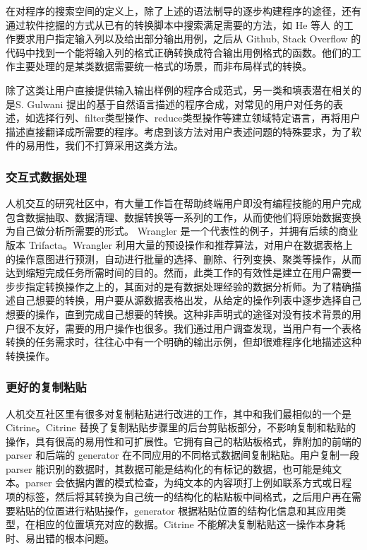 \documentclass[design, pageheader]{njubachelor}
\begin{document}
在对程序的搜索空间的定义上，除了上述的语法制导的逐步构建程序的途径，还有通过软件挖掘的方式从已有的转换脚本中搜索满足需要的方法，如 He 等人\cite{he18} 的工作要求用户指定输入列以及给出部分输出用例，之后从 Github, Stack Overflow 的代码中找到一个能将输入列的格式正确转换成符合输出用例格式的函数。他们的工作主要处理的是某类数据需要统一格式的场景，而非布局样式的转换。

除了这类让用户直接提供输入输出样例的程序合成范式，另一类和填表潜在相关的是S. Gulwani 提出的基于自然语言描述的程序合成\cite{gulwani14}，对常见的用户对任务的表述，如选择行列、filter类型操作、reduce类型操作等建立领域特定语言，再将用户描述直接翻译成所需要的程序。考虑到该方法对用户表述问题的特殊要求，为了软件的易用性，我们不打算采用这类方法。

\subsubsection{交互式数据处理}
人机交互的研究社区中，有大量工作旨在帮助终端用户即没有编程技能的用户完成包含数据抽取、数据清理、数据转换等一系列的工作，从而使他们将原始数据变换为自己做分析所需要的形式。 Wrangler\cite{kandel11} 是一个代表性的例子，并拥有后续的商业版本 Trifacta。Wrangler 利用大量的预设操作和推荐算法，对用户在数据表格上的操作意图进行预测，自动进行批量的选择、删除、行列变换、聚类等操作，从而达到缩短完成任务所需时间的目的。然而，此类工作的有效性是建立在用户需要一步步指定转换操作之上的，其面对的是有数据处理经验的数据分析师。为了精确描述自己想要的转换，用户要从源数据表格出发，从给定的操作列表中逐步选择自己想要的操作，直到完成自己想要的转换。这种非声明式的途径对没有技术背景的用户很不友好，需要的用户操作也很多。我们通过用户调查发现，当用户有一个表格转换的任务需求时，往往心中有一个明确的输出示例，但却很难程序化地描述这种转换操作。

\subsubsection{更好的复制粘贴}
人机交互社区里有很多对复制粘贴进行改进的工作，其中和我们最相似的一个是Citrine。Citrine \cite{stylos04} 替换了复制粘贴步骤里的后台剪贴板部分，不影响复制和粘贴的操作，具有很高的易用性和可扩展性。它拥有自己的粘贴板格式，靠附加的前端的 parser 和后端的 generator 在不同应用的不同格式数据间复制粘贴。用户复制一段 parser 能识别的数据时，其数据可能是结构化的有标记的数据，也可能是纯文本。parser 会依据内置的模式检查，为纯文本的内容项打上例如联系方式或日程项的标签，然后将其转换为自己统一的结构化的粘贴板中间格式，之后用户再在需要粘贴的位置进行粘贴操作，generator 根据粘贴位置的结构化信息和其应用类型，在相应的位置填充对应的数据。Citrine 不能解决复制粘贴这一操作本身耗时、易出错的根本问题。
\end{document}
